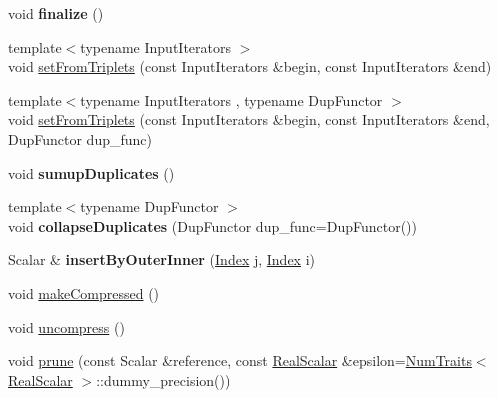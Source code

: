 \begin{DoxyCompactItemize}
\item 
\mbox{\label{class_eigen_1_1_sparse_matrix_a505802f4dd45f7c036ad28261f065610}} 
void {\bfseries finalize} ()
\item 
{\footnotesize template$<$typename Input\+Iterators $>$ }\\void \mbox{\hyperlink{class_eigen_1_1_sparse_matrix_acc35051d698e3973f1de5b9b78dbe345}{set\+From\+Triplets}} (const Input\+Iterators \&begin, const Input\+Iterators \&end)
\item 
{\footnotesize template$<$typename Input\+Iterators , typename Dup\+Functor $>$ }\\void \mbox{\hyperlink{class_eigen_1_1_sparse_matrix_ad3eee2d3d2a9843cd095c0207f781e7e}{set\+From\+Triplets}} (const Input\+Iterators \&begin, const Input\+Iterators \&end, Dup\+Functor dup\+\_\+func)
\item 
\mbox{\label{class_eigen_1_1_sparse_matrix_a591c7b14101a2a2141c10b75b58ab36f}} 
void {\bfseries sumup\+Duplicates} ()
\item 
\mbox{\label{class_eigen_1_1_sparse_matrix_a87ff49d0917b31f98862b661a5d72eec}} 
{\footnotesize template$<$typename Dup\+Functor $>$ }\\void {\bfseries collapse\+Duplicates} (Dup\+Functor dup\+\_\+func=Dup\+Functor())
\item 
\mbox{\label{class_eigen_1_1_sparse_matrix_adcdc8e0393507f9de5559c8c28589c9b}} 
Scalar \& {\bfseries insert\+By\+Outer\+Inner} (\mbox{\hyperlink{struct_eigen_1_1_eigen_base_a554f30542cc2316add4b1ea0a492ff02}{Index}} j, \mbox{\hyperlink{struct_eigen_1_1_eigen_base_a554f30542cc2316add4b1ea0a492ff02}{Index}} i)
\item 
void \mbox{\hyperlink{class_eigen_1_1_sparse_matrix_a5ff54ffc10296f9466dc81fa888733fd}{make\+Compressed}} ()
\item 
void \mbox{\hyperlink{class_eigen_1_1_sparse_matrix_a7e560ebda035e992d2c99875cc7c3af3}{uncompress}} ()
\item 
void \mbox{\hyperlink{class_eigen_1_1_sparse_matrix_a08af03b2fc6c371c8be4fcd62509288c}{prune}} (const Scalar \&reference, const \mbox{\hyperlink{class_eigen_1_1_sparse_matrix_base_aaec8ace6efb785c81d442931c3248d88}{Real\+Scalar}} \&epsilon=\mbox{\hyperlink{struct_eigen_1_1_num_traits}{Num\+Traits}}$<$ \mbox{\hyperlink{class_eigen_1_1_sparse_matrix_base_aaec8ace6efb785c81d442931c3248d88}{Real\+Scalar}} $>$\+::dummy\+\_\+precision())

\end{DoxyCompactItemize}
